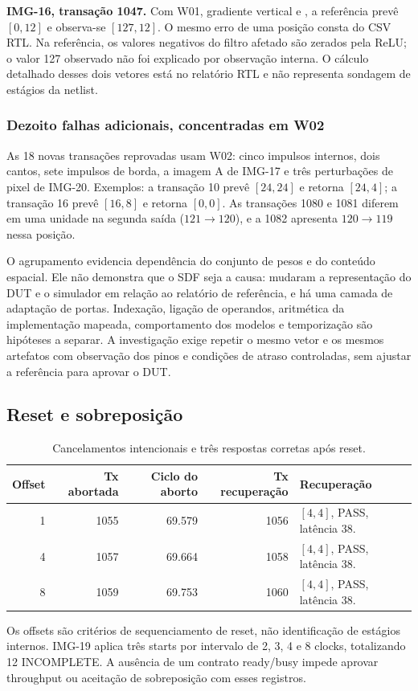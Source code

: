 \documentclass[12pt,a4paper]{article}
\newcommand{\arquivo}[1]{\texttt{\detokenize{#1}}}
\begin{document}
\textbf{IMG-16, transação 1047.} Com W01, gradiente vertical e \arquivo{ConvBias2[0]=-45}, a referência prevê $[0,12]$ e observa-se $[127,12]$. O mesmo erro de uma posição consta do CSV RTL. Na referência, os valores negativos do filtro afetado são zerados pela ReLU; o valor 127 observado não foi explicado por observação interna. O cálculo detalhado desses dois vetores está no relatório RTL e não representa sondagem de estágios da netlist.

\subsubsection{Dezoito falhas adicionais, concentradas em W02}
As 18 novas transações reprovadas usam W02: cinco impulsos internos, dois cantos, sete impulsos de borda, a imagem A de IMG-17 e três perturbações de pixel de IMG-20. Exemplos: a transação 10 prevê $[24,24]$ e retorna $[24,4]$; a transação 16 prevê $[16,8]$ e retorna $[0,0]$. As transações 1080 e 1081 diferem em uma unidade na segunda saída ($121\to120$), e a 1082 apresenta $120\to119$ nessa posição.

O agrupamento evidencia dependência do conjunto de pesos e do conteúdo espacial. Ele não demonstra que o SDF seja a causa: mudaram a representação do DUT e o simulador em relação ao relatório de referência, e há uma camada de adaptação de portas. Indexação, ligação de operandos, aritmética da implementação mapeada, comportamento dos modelos e temporização são hipóteses a separar. A investigação exige repetir o mesmo vetor e os mesmos artefatos com observação dos pinos e condições de atraso controladas, sem ajustar a referência para aprovar o DUT.

\subsection{Reset e sobreposição}
\begin{table}[H]\centering\small
\begin{tabular}{rrrrl}\toprule
\textbf{Offset} & \textbf{Tx abortada} & \textbf{Ciclo do aborto} & \textbf{Tx recuperação} & \textbf{Recuperação}\\\midrule
1 & 1055 & 69.579 & 1056 & $[4,4]$, PASS, latência 38.\\
4 & 1057 & 69.664 & 1058 & $[4,4]$, PASS, latência 38.\\
8 & 1059 & 69.753 & 1060 & $[4,4]$, PASS, latência 38.\\\bottomrule
\end{tabular}
\caption{Cancelamentos intencionais e três respostas corretas após reset.}
\end{table}
Os offsets são critérios de sequenciamento de reset, não identificação de estágios internos. IMG-19 aplica três starts por intervalo de 2, 3, 4 e 8 clocks, totalizando 12 INCOMPLETE. A ausência de um contrato ready/busy impede aprovar throughput ou aceitação de sobreposição com esses registros.
\end{document}
